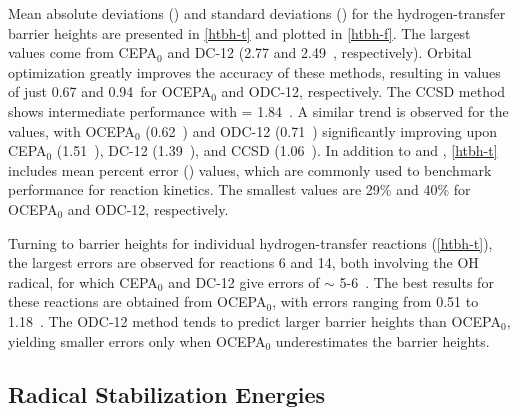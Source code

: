 Mean absolute deviations (\mae) and standard deviations (\std) for the
hydrogen-transfer barrier heights are presented in \cref{htbh-t} and plotted in
\cref{htbh-f}.
The largest \mae values come from CEPA$_0$ and DC-12 (2.77 and 2.49~\kcal,
respectively).
Orbital optimization greatly improves the accuracy of these methods, resulting
in \mae values of just 0.67 and 0.94~\kcal for OCEPA$_0$ and ODC-12,
respectively.
The CCSD method shows intermediate performance with \mae = 1.84~\kcal.
A similar trend is observed for the \std values, with OCEPA$_0$ (0.62~\kcal) and
ODC-12 (0.71~\kcal) significantly improving upon CEPA$_0$ (1.51~\kcal), DC-12
(1.39~\kcal), and CCSD (1.06~\kcal).
In addition to \mae and \std, \cref{htbh-t} includes mean percent error (\rel)
values, which are commonly used to benchmark performance for reaction kinetics.
The smallest \rel values are 29\% and 40\% for OCEPA$_0$ and ODC-12,
respectively.

Turning to barrier heights for individual hydrogen-transfer reactions
(\cref{htbh-t}), the largest errors are observed for reactions 6 and 14, both
involving the OH radical, for which CEPA$_0$ and DC-12 give errors of $\sim$
5-6~\kcal.
The best results for these reactions are obtained from OCEPA$_0$, with errors
ranging from 0.51 to 1.18~\kcal.
The ODC-12 method tends to predict larger barrier heights than OCEPA$_0$,
yielding smaller errors only when OCEPA$_0$ underestimates the barrier heights.

\subsection{Radical Stabilization Energies}

